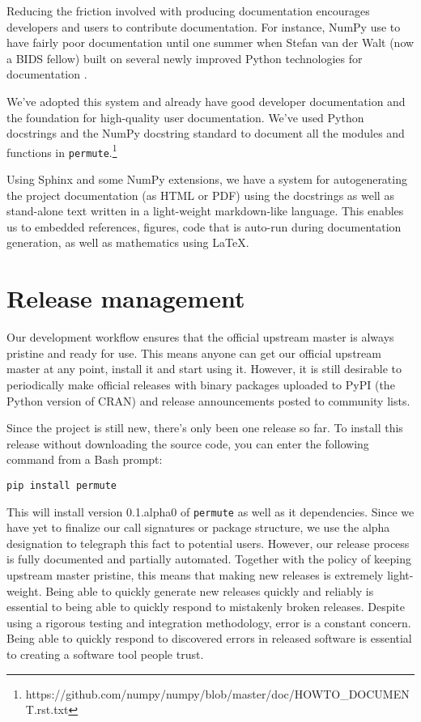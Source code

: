 Reducing the
friction involved with producing documentation encourages developers and users
to contribute documentation.  For instance, NumPy use to have fairly poor
documentation until one summer when Stefan van der Walt (now a BIDS fellow)
built on several newly improved Python technologies for documentation
\cite{SciPyProceedings_27}.

We've adopted this system and already have good developer documentation and the
foundation for high-quality user documentation. We've used Python docstrings and
the NumPy docstring standard to document all the modules and functions in
\texttt{permute}.\footnote{https://github.com/numpy/numpy/blob/master/doc/HOWTO\_DOCUMENT.rst.txt}

Using Sphinx and some NumPy extensions, we have a system for autogenerating the
project documentation (as HTML or PDF) using the docstrings as well as
stand-alone text written in a light-weight markdown-like language.  This
enables us to embedded references, figures, code that is auto-run during
documentation generation, as well as mathematics using \LaTeX.

\section{\label{sec:release}Release management}

Our development workflow ensures that the official upstream master is always
pristine and ready for use.  This means anyone can get our official upstream
master at any point, install it and start using it.  However, it is still
desirable to periodically make official releases with binary packages uploaded
to PyPI (the Python version of CRAN) and release announcements posted to
community lists.

Since the project is still new, there's only been one release so far.  To install
this release without downloading the source code, you can enter the following
command from a Bash prompt:
\begin{verbatim}
pip install permute
\end{verbatim}
This will install version 0.1.alpha0 of \texttt{permute} as well as it
dependencies.  Since we have yet to finalize our call signatures or package
structure, we use the alpha designation to telegraph this fact to
potential users.  However, our release process is fully documented and
partially automated.  Together with the policy of keeping upstream master
pristine, this means that making new releases is extremely light-weight.  Being
able to quickly generate new releases quickly and reliably is essential to being able to
quickly respond to mistakenly broken releases.  Despite using a rigorous
testing and integration methodology, error is a constant concern.  Being able
to quickly respond to discovered errors in released software is essential to
creating a software tool people trust.
